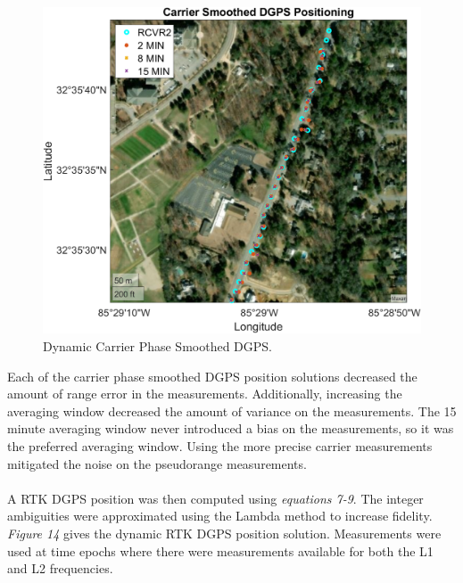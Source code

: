 \documentclass[11pt]{article}
\begin{document}
\begin{enumerate}[label=\textbf{\arabic*.}]
\begin{figure}[H]
\begin{minipage}[b]{0.49\textwidth}
          \includegraphics[width=\textwidth]{p3_c1.png}
        \end{minipage}
        \caption{Dynamic Carrier Phase Smoothed DGPS.}
      \end{figure}
      Each of the carrier phase smoothed DGPS position solutions decreased the amount of 
      range error in the measurements. Additionally, increasing the averaging window 
      decreased the amount of variance on the measurements. The 15 minute averaging 
      window never introduced a bias on the measurements, so it was the preferred averaging 
      window. Using the more precise carrier measurements mitigated the noise on the 
      pseudorange measurements. 
      \\ \\
      A RTK DGPS position was then computed using \emph{equations 7-9}. The integer 
      ambiguities were approximated using the Lambda method to increase fidelity. 
      \emph{Figure 14} gives the dynamic RTK DGPS position solution. Measurements were used 
      at time epochs where there were measurements available for both the L1 and L2 
      frequencies.
      \begin{figure}[H]
        \centering
        \begin{minipage}[b]{0.49\textwidth}

\end{minipage}
\end{figure}
\end{enumerate}
\end{document}
